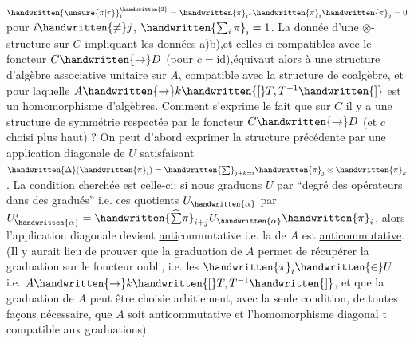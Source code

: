 
$\handwritten{\unsure{\pi|\tau}}_i^{\handwritten{2}}=\handwritten{\pi}_i,\handwritten{\pi}_i\handwritten{\pi}_j=0$ pour $i\handwritten{\ne}j$, $\handwritten{\sum_i\pi}_i=1$. La donnée d'une $\otimes$-structure sur $C$ impliquant les données a)b),et celles-ci compatibles avec le foncteur $C\handwritten{\to}D$ (pour $c=\mathrm{id}$),équivaut alors à une structure d'algèbre associative unitaire sur $A$, compatible avec la structure de coalgèbre, et pour laquelle $A\handwritten{\to}k\handwritten{[}T,T^{-1}\handwritten{]}$ est un homomorphisme d'algèbres. Comment s'exprime le fait que  sur $C$ il y a une structure de symmétrie  respectée par le foncteur $C\handwritten{\to}D$ (et $c$ choisi plus haut) ? On peut d'abord exprimer la structure précédente par une application diagonale de $U$ satisfaisant $\handwritten{\Delta}(\handwritten{\pi}_i)=\handwritten{\sum}_{j+k=i}\handwritten{\pi}_j\otimes\handwritten{\pi}_k$. La condition cherchée  est celle-ci: si nous graduons $U$ par ``degré des opérateurs dans des gradués'' i.e.  ces quotients $U_{\handwritten{\alpha}}$ par $U_{\handwritten{\alpha}}^i=\handwritten{\widehat{\sum}\pi}_{i+j}U_{\handwritten{\alpha}}\handwritten{\pi}_i$, alors l'application diagonale devient \uline{anti}commutative i.e. la  de $A$  est \uline{anticommutative}. (Il y aurait lieu de prouver que la graduation de $A$ permet de récupérer la  graduation sur le foncteur oubli, i.e. les $\handwritten{\pi}_i\handwritten{\in}U$ i.e. $A\handwritten{\to}k\handwritten{[}T,T^{-1}\handwritten{]}$, et que la graduation de $A$  peut être choisie arbitiement, avec la seule condition, de toutes façons nécessaire, que $A$ soit anticommutative et l'homomorphisme diagonal t compatible aux graduations).

